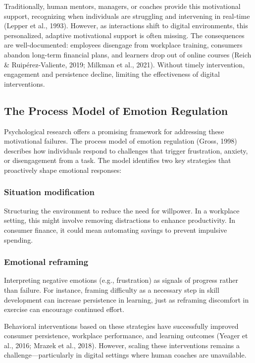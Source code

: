 \documentclass[11pt]{report}
\begin{document}
\begin{mainf}
Traditionally, human mentors, managers, or coaches provide this motivational support, recognizing when individuals are struggling and intervening in real-time (Lepper et al., 1993). 
However, as interactions shift to digital environments, this personalized, adaptive motivational support is often missing. 
The consequences are well-documented: employees disengage from workplace training, consumers abandon long-term financial plans, and learners drop out of online courses (Reich \& Ruipérez-Valiente, 2019; Milkman et al., 2021). 
Without timely intervention, engagement and persistence decline, limiting the effectiveness of digital interventions.

\subsection{The Process Model of Emotion Regulation}
Psychological research offers a promising framework for addressing these motivational failures. 
The process model of emotion regulation (Gross, 1998) describes how individuals respond to challenges that trigger frustration, anxiety, or disengagement from a task. 
The model identifies two key strategies that proactively shape emotional responses:

\subsubsection{Situation modification} 
Structuring the environment to reduce the need for willpower. 
In a workplace setting, this might involve removing distractions to enhance productivity. 
In consumer finance, it could mean automating savings to prevent impulsive spending.

\subsubsection{Emotional reframing} Interpreting negative emotions (e.g., frustration) as signals of progress rather than failure. 
For instance, framing difficulty as a necessary step in skill development can increase persistence in learning, just as reframing discomfort in exercise can encourage continued effort.

Behavioral interventions based on these strategies have successfully improved consumer persistence, workplace performance, and learning outcomes (Yeager et al., 2016; Mrazek et al., 2018). 
However, scaling these interventions remains a challenge—particularly in digital settings where human coaches are unavailable.


\end{mainf}
\end{document}

